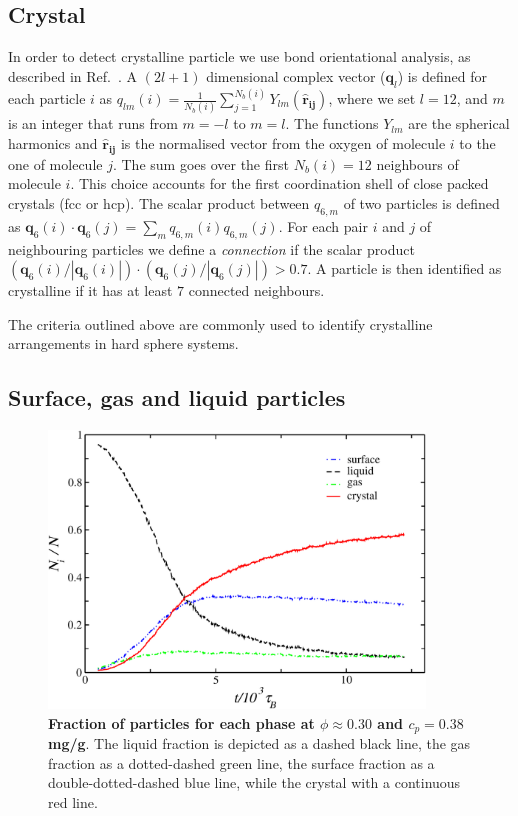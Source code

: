 \subsection*{Crystal}
In order to detect crystalline particle we use bond orientational analysis,
as described in Ref.~\cite{russo2013interplay}.
A $(2l+1)$ dimensional complex vector ($\mathbf{q}_l$) is defined for each
particle $i$ as $q_{lm}(i)=\frac{1}{N_b(i)}\sum_{j=1}^{N_b(i)}
Y_{lm}(\mathbf{\hat{r}_{ij}})$, where we set $l=12$, and $m$ is an integer that
runs from $m=-l$ to $m=l$. The functions $Y_{lm}$ are the spherical harmonics
and $\mathbf{\hat{r}_{ij}}$ is the normalised vector from the oxygen of
molecule $i$ to the one of molecule $j$.  The sum goes over the first
$N_b(i)=12$ neighbours of molecule $i$. This choice accounts for
the first coordination shell of close packed crystals (fcc or hcp).
The scalar product between $q_{6,m}$ of two particles
is defined as $\mathbf{q}_{6}(i)\cdot\mathbf{q}_{6}(j)=\sum_m q_{6,m}(i)q_{6,m}(j)$.
For each pair $i$ and $j$ of neighbouring particles we define a \emph{connection}
if the scalar product $(\mathbf{q}_{6}(i)/|\mathbf{q}_{6}(i)|)\cdot(\mathbf{q}_{6}(j)/|\mathbf{q}_{6}(j)|)>0.7$.
A particle is then identified as crystalline if it has at least $7$ connected neighbours.

The criteria outlined above are commonly used to identify crystalline arrangements in hard sphere systems.

\subsection*{Surface, gas and liquid particles}

\begin{figure}[!b]
 \centering
 \includegraphics[width=10cm]{./fractions.pdf}
 \caption{{\bf Fraction of particles for each phase at $\phi\approx 0.30$ and $c_p=0.38$ mg/g}. The liquid
 fraction is depicted as a dashed black line, the gas fraction as a dotted-dashed green line, the surface
 fraction as a double-dotted-dashed blue line, while the crystal with a continuous red line.}
 \label{fig:fractions}
\end{figure}

